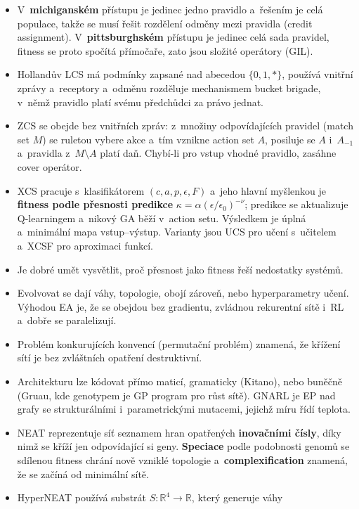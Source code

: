 \documentclass[11pt,a4paper]{article}
\theoremstyle{definition}
\begin{document}
\begin{itemize}
\item V~\textbf{michiganském} přístupu je jedinec jedno pravidlo a~řešením je celá
  populace, takže se musí řešit rozdělení odměny mezi pravidla (credit assignment).
  V~\textbf{pittsburghském} přístupu je jedinec celá sada pravidel, fitness se proto
  spočítá přímočaře, zato jsou složité operátory (GIL).
\item Hollandův LCS má podmínky zapsané nad abecedou $\{0,1,*\}$, používá vnitřní zprávy
  a~receptory a~odměnu rozděluje mechanismem bucket brigade, v~němž pravidlo platí svému
  předchůdci za právo jednat.
\item ZCS se obejde bez vnitřních zpráv: z~množiny odpovídajících pravidel (match set
  $M$) se ruletou vybere akce a~tím vznikne action set $A$, posiluje se $A$ i~$A_{-1}$
  a~pravidla z~$M \setminus A$ platí daň. Chybí-li pro vstup vhodné pravidlo, zasáhne
  cover operátor.
\item XCS pracuje s~klasifikátorem $(c,a,p,\epsilon,F)$ a~jeho hlavní myšlenkou je
  \textbf{fitness podle přesnosti predikce} $\kappa = \alpha(\epsilon/\epsilon_0)^{-\nu}$;
  predikce se aktualizuje Q-learningem a~nikový GA běží v~action setu.
  Výsledkem je úplná a~minimální mapa vstup--výstup. Varianty jsou UCS pro učení
  s~učitelem a~XCSF pro aproximaci funkcí.
\item Je dobré umět vysvětlit, proč přesnost jako fitness řeší nedostatky
   systémů.
\item Evolvovat se dají váhy, topologie, obojí zároveň, nebo hyperparametry učení.
  Výhodou EA je, že se obejdou bez gradientu, zvládnou rekurentní sítě i~RL a~dobře se
  paralelizují.
\item Problém konkurujících konvencí (permutační problém) znamená, že křížení sítí je
  bez zvláštních opatření destruktivní.
\item Architekturu lze kódovat přímo maticí, gramaticky (Kitano), nebo buněčně (Gruau,
  kde genotypem je GP program pro růst sítě). GNARL je EP nad grafy se strukturálními
  i~parametrickými mutacemi, jejichž míru řídí teplota.
\item NEAT reprezentuje síť seznamem hran opatřených \textbf{inovačními čísly}, díky
  nimž se kříží jen odpovídající si geny. \textbf{Speciace} podle podobnosti genomů se
  sdílenou fitness chrání nově vzniklé topologie a~\textbf{complexification} znamená, že
  se začíná od minimální sítě.
\item HyperNEAT používá substrát $S:\mathbb{R}^4 \to \mathbb{R}$, který generuje váhy

\end{itemize}
\end{document}
